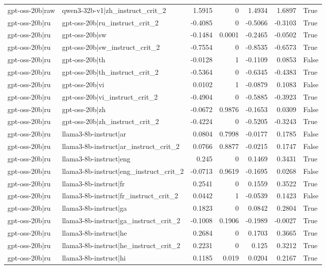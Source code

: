 \begin{table}
\begin{tabular}{l l r r r r l}
gpt-oss-20b|raw & qwen3-32b-v1|zh_instruct_crit_2 & 1.5915 & 0 & 1.4934 & 1.6897 & True \\
gpt-oss-20b|ru & gpt-oss-20b|ru_instruct_crit_2 & -0.4085 & 0 & -0.5066 & -0.3103 & True \\
gpt-oss-20b|ru & gpt-oss-20b|sw & -0.1484 & 0.0001 & -0.2465 & -0.0502 & True \\
gpt-oss-20b|ru & gpt-oss-20b|sw_instruct_crit_2 & -0.7554 & 0 & -0.8535 & -0.6573 & True \\
gpt-oss-20b|ru & gpt-oss-20b|th & -0.0128 & 1 & -0.1109 & 0.0853 & False \\
gpt-oss-20b|ru & gpt-oss-20b|th_instruct_crit_2 & -0.5364 & 0 & -0.6345 & -0.4383 & True \\
gpt-oss-20b|ru & gpt-oss-20b|vi & 0.0102 & 1 & -0.0879 & 0.1083 & False \\
gpt-oss-20b|ru & gpt-oss-20b|vi_instruct_crit_2 & -0.4904 & 0 & -0.5885 & -0.3923 & True \\
gpt-oss-20b|ru & gpt-oss-20b|zh & -0.0672 & 0.9876 & -0.1653 & 0.0309 & False \\
gpt-oss-20b|ru & gpt-oss-20b|zh_instruct_crit_2 & -0.4224 & 0 & -0.5205 & -0.3243 & True \\
gpt-oss-20b|ru & llama3-8b-instruct|ar & 0.0804 & 0.7998 & -0.0177 & 0.1785 & False \\
gpt-oss-20b|ru & llama3-8b-instruct|ar_instruct_crit_2 & 0.0766 & 0.8877 & -0.0215 & 0.1747 & False \\
gpt-oss-20b|ru & llama3-8b-instruct|eng & 0.245 & 0 & 0.1469 & 0.3431 & True \\
gpt-oss-20b|ru & llama3-8b-instruct|eng_instruct_crit_2 & -0.0713 & 0.9619 & -0.1695 & 0.0268 & False \\
gpt-oss-20b|ru & llama3-8b-instruct|fr & 0.2541 & 0 & 0.1559 & 0.3522 & True \\
gpt-oss-20b|ru & llama3-8b-instruct|fr_instruct_crit_2 & 0.0442 & 1 & -0.0539 & 0.1423 & False \\
gpt-oss-20b|ru & llama3-8b-instruct|ga & 0.1823 & 0 & 0.0842 & 0.2804 & True \\
gpt-oss-20b|ru & llama3-8b-instruct|ga_instruct_crit_2 & -0.1008 & 0.1906 & -0.1989 & -0.0027 & True \\
gpt-oss-20b|ru & llama3-8b-instruct|he & 0.2684 & 0 & 0.1703 & 0.3665 & True \\
gpt-oss-20b|ru & llama3-8b-instruct|he_instruct_crit_2 & 0.2231 & 0 & 0.125 & 0.3212 & True \\
gpt-oss-20b|ru & llama3-8b-instruct|hi & 0.1185 & 0.019 & 0.0204 & 0.2167 & True \\

\end{tabular}
\end{table}
